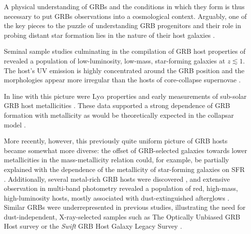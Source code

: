 \documentclass[traditabstract, longauth]{aa}
\begin{document}
A physical understanding of GRBs and the conditions in which they form is thus necessary to put GRBs observations into a cosmological context. Arguably, one of the key pieces to the puzzle of understanding GRB progenitors and their role in probing distant star formation lies in the nature of their host galaxies \citep[e.g.,][for a review]{2014PASP..126....1L}. 

Seminal sample studies \citep[e.g.,][]{2003A&A...400..499L, 2004A&A...425..913C, 2004MNRAS.352.1073T, 2010AJ....139..694L} culminating in the compilation of GRB host properties of \citet{2009ApJ...691..182S} revealed a population of low-luminosity, low-mass, star-forming galaxies at $z\lesssim1$. The host's UV emission is highly concentrated around the GRB position and the morphologies appear more irregular than the hosts of core-collapse supernovae \citep{2006Natur.441..463F, 2010MNRAS.405...57S}. 

In line with this picture were Ly$\alpha$ properties \citep{2003A&A...406L..63F, 2012ApJ...756...25M} and early measurements of sub-solar GRB host metallicities \citep[e.g.,][]{2004ApJ...611..200P, 2005A&A...444..711G, 2005NewA...11..103S}. These data supported a strong dependence of GRB formation with metallicity \citep[e.g.,][]{2005A&A...443..581H, 2006A&A...460..199Y} as would be theoretically expected in the collapsar model \citep{1993ApJ...405..273W, 1999ApJ...524..262M}. 

More recently, however, this previously quite uniform picture of GRB hosts became somewhat more diverse: the offset of GRB-selected galaxies towards lower metallicities in the mass-metallicity relation \citep{2010AJ....140.1557L} could, for example, be partially explained with the dependence of the metallicity of star-forming galaxies on SFR \citep[e.g.,][]{2011MNRAS.414.1263M, 2011ApJ...735L...8K}. Additionally, several metal-rich GRB hosts were discovered \citep{2010ApJ...712L..26L, 2013A&A...556A..23E, 2015Patsubm}, and extensive observation in multi-band photometry revealed a population of red, high-mass, high-luminosity hosts, mostly associated with dust-extinguished afterglows \citep{2011A&A...534A.108K, 2012A&A...545A..77R, 2012ApJ...756..187H, 2013ApJ...778..128P}. Similar GRBs were underrepresented in previous studies, illustrating the need for dust-independent, X-ray-selected samples such as The Optically Unbiased GRB Host survey \citep[TOUGH,][]{2012ApJ...756..187H} or the \textit{Swift} GRB Host Galaxy Legacy Survey \citep[SHOALS,][]{2015arXiv150402482P}.
\end{document}
